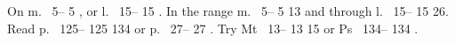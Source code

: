 \documentclass{article}
\makeatletter
\newcommand*\range[1]{%
	\@ifnextchar\bgroup
		{#1--}
		{#1}%
}
\newcommand{\loc}[2]{#1.~\range{#2}}
\newcommand{\bible}[2]{#1~\range{#2}}
\makeatother
\begin{document}
On \loc{m}{5}, or \loc{l}{15}.
In the range \loc{m}{5}{13} and through \loc{l}{15}{26}.
Read \loc{p}{125}{134} or \loc{p}{27}.
Try \bible{Mt}{13}{15} or \bible{Ps}{134}.
\end{document}
